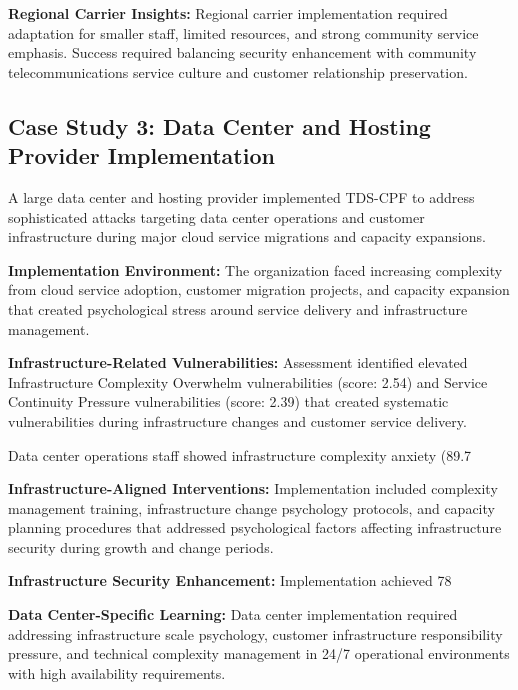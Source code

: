 \documentclass[10pt, twocolumn]{article}
\begin{document}
\textbf{Regional Carrier Insights:} Regional carrier implementation required adaptation for smaller staff, limited resources, and strong community service emphasis. Success required balancing security enhancement with community telecommunications service culture and customer relationship preservation.

\subsection{Case Study 3: Data Center and Hosting Provider Implementation}

A large data center and hosting provider implemented TDS-CPF to address sophisticated attacks targeting data center operations and customer infrastructure during major cloud service migrations and capacity expansions.

\textbf{Implementation Environment:} The organization faced increasing complexity from cloud service adoption, customer migration projects, and capacity expansion that created psychological stress around service delivery and infrastructure management.

\textbf{Infrastructure-Related Vulnerabilities:} Assessment identified elevated Infrastructure Complexity Overwhelm vulnerabilities (score: 2.54) and Service Continuity Pressure vulnerabilities (score: 2.39) that created systematic vulnerabilities during infrastructure changes and customer service delivery.

Data center operations staff showed infrastructure complexity anxiety (89.7%

\textbf{Infrastructure-Aligned Interventions:} Implementation included complexity management training, infrastructure change psychology protocols, and capacity planning procedures that addressed psychological factors affecting infrastructure security during growth and change periods.

\textbf{Infrastructure Security Enhancement:} Implementation achieved 78%

\textbf{Data Center-Specific Learning:} Data center implementation required addressing infrastructure scale psychology, customer infrastructure responsibility pressure, and technical complexity management in 24/7 operational environments with high availability requirements.
\end{document}
